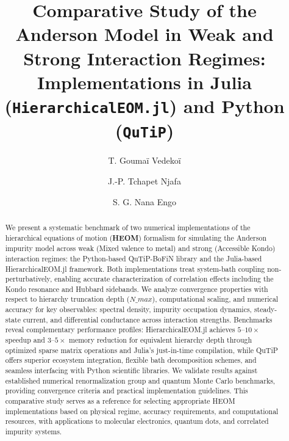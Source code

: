 \documentclass[preprint,1p]{elsarticle}
\begin{document}
\begin{frontmatter}

\title{Comparative Study of the Anderson Model in Weak and Strong Interaction Regimes: Implementations in Julia (\texttt{HierarchicalEOM.jl}) and Python (\texttt{QuTiP})}

\begin{abstract}
We present a systematic benchmark of two numerical implementations of the hierarchical equations of motion (\textbf{HEOM}) formalism for simulating the Anderson impurity model across weak (Mixed valence to metal) and strong (Accessible Kondo) interaction regimes: the Python-based QuTiP-BoFiN library and the Julia-based HierarchicalEOM.jl framework. Both implementations treat system-bath coupling non-perturbatively, enabling accurate characterization of correlation effects including the Kondo resonance and Hubbard sidebands. We analyze convergence properties with respect to hierarchy truncation depth ($N\_{max}$), computational scaling, and numerical accuracy for key observables: spectral density, impurity occupation dynamics, steady-state current, and differential conductance across interaction strengths. Benchmarks reveal complementary performance profiles: HierarchicalEOM.jl achieves $5 – 10 \times$ speedup and $3 – 5 \times$ memory reduction for equivalent hierarchy depth through optimized sparse matrix operations and Julia's just-in-time compilation, while QuTiP offers superior ecosystem integration, flexible bath decomposition schemes, and seamless interfacing with Python scientific libraries. We validate results against established numerical renormalization group and quantum Monte Carlo benchmarks, providing convergence criteria and practical implementation guidelines. This comparative study serves as a reference for selecting appropriate HEOM implementations based on physical regime, accuracy requirements, and computational resources, with applications to molecular electronics, quantum dots, and correlated impurity systems.
\end{abstract}

\author[1]{T. Goumaï Vedekoï}

\author[1]{J.-P. Tchapet Njafa\texorpdfstring{}{}}

\author[1]{S. G. Nana Engo}



\end{frontmatter}
\end{document}

